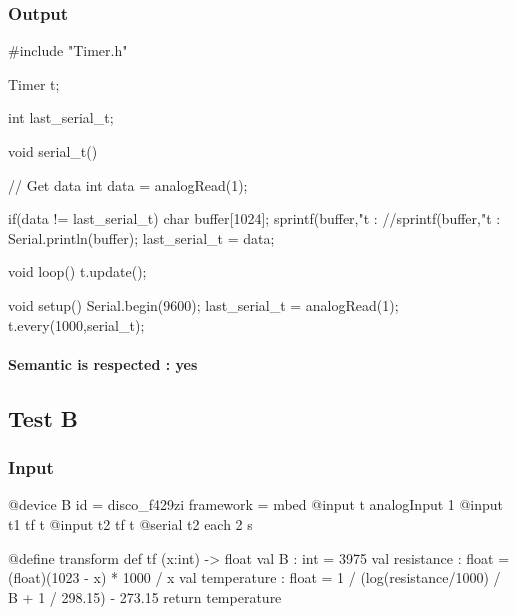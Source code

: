 \subsubsection*{Output}
\begin{arduinocode}
#include "Timer.h"

Timer t;

int last_serial_t;

void serial_t() {
    // Get data
    int data = analogRead(1);

    if(data != last_serial_t) {
        char buffer[1024];
        sprintf(buffer,"t : %
        //sprintf(buffer,"t : %
        Serial.println(buffer);
    }
    last_serial_t = data;
}

void loop(){
    t.update();
}

void setup() {
    Serial.begin(9600);
    last_serial_t = analogRead(1);
    t.every(1000,serial_t);
}
\end{arduinocode}

\paragraph*{Semantic is respected : yes}
\newpage

\subsection{Test B}
\label{subsec:test_B}

\subsubsection*{Input}
\begin{apdlcode}
@device B {
    id = disco_f429zi
    framework = mbed
    @input t analogInput 1
    @input t1 tf t
    @input t2 tf t
    @serial t2 each 2 s
}

@define transform def tf (x:int) -> float {
    val B : int = 3975
    val resistance : float = (float)(1023 - x) * 1000 / x
    val temperature : float = 1 / (log(resistance/1000) / B + 1 / 298.15) - 273.15
    return temperature
}
\end{apdlcode}

